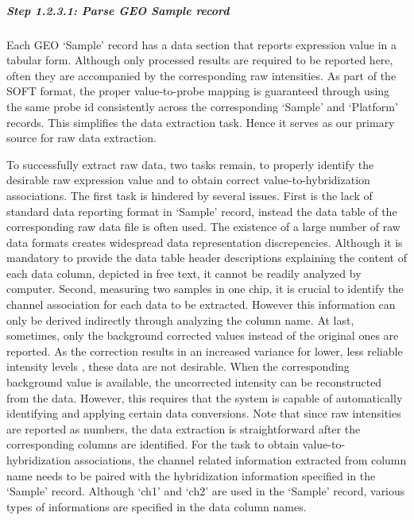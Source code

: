 \subparagraph{\textit{Step 1.2.3.1: Parse GEO Sample record}}
Each GEO `Sample' record has a data section that reports expression value in a
tabular form.
%
Although only processed results are required to be reported here, often they
are accompanied by the corresponding raw intensities.
%
As part of the SOFT format, the proper value-to-probe mapping is guaranteed
through using the same probe id consistently across the corresponding `Sample'
and `Platform' records.
%
This simplifies the data extraction task. 
%
Hence it serves as our primary source for raw data extraction.

To successfully extract raw data, two tasks remain, to properly identify the
desirable raw expression value and to obtain correct value-to-hybridization
associations.
%
The first task is hindered by several issues. 
%
First is the lack of standard data reporting format in `Sample' record,
instead the data table of the corresponding raw data file is often used.
%
The existence of a large number of raw data formats creates widespread data
representation discrepencies.
%
Although it is mandatory to provide the data table header descriptions
explaining the content of each data column, depicted in free text, it cannot
be readily analyzed by computer.
%
Second, measuring two samples in one chip, it is crucial to identify the
channel association for each data to be extracted.  However this information
can only be derived indirectly through analyzing the column name.
%
At last, sometimes, only the background corrected values instead of the
original ones are reported.  As the correction results in an increased
variance for lower, less reliable intensity levels \cite{Ritchie2007}, these
data are not desirable.
%
When the corresponding background value is available, the uncorrected
intensity can be reconstructed from the data.  However, this requires that the
system is capable of automatically identifying and applying certain data
conversions.
%
Note that since raw intensities are reported as numbers, the data extraction
is straightforward after the corresponding columns are identified.
%
For the task to obtain value-to-hybridization associations, the channel
related information extracted from column name needs to be paired with the
hybridization information specified in the `Sample' record.
%
Although `ch1' and `ch2' are used in the `Sample' record, various types of
informations are specified in the data column names.

